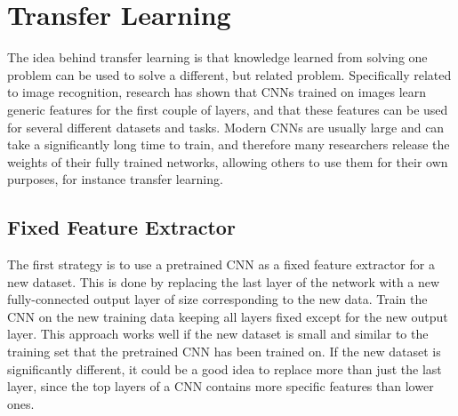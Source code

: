 \section{Transfer Learning}

The idea behind transfer learning is that knowledge learned from solving one problem can be used to solve a different, but related problem. Specifically related to image recognition, research has shown that CNNs trained on images learn generic features for the first couple of layers, and that these features can be used for several different datasets and tasks. Modern CNNs are usually large and can take a significantly long time to train, and therefore many researchers release the weights of their fully trained networks, allowing others to use them for their own purposes, for instance transfer learning. \\ 

\subsection{Fixed Feature Extractor}

The first strategy is to use a pretrained CNN as a fixed feature extractor for a new dataset. This is done by replacing the last layer of the network with a new fully-connected output layer of size corresponding to the new data. Train the CNN on the new training data keeping all layers fixed except for the new output layer. This approach works well if the new dataset is small and similar to the training set that the pretrained CNN has been trained on. If the new dataset is significantly different, it could be a good idea to replace more than just the last layer, since the top layers of a CNN contains more specific features than lower ones. 

